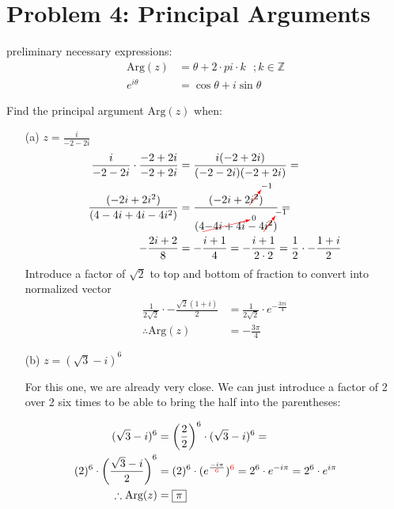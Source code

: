 \documentclass{article}
\newcommand{\canceling}[2]{\textcolor{red}{\cancelto{\textcolor{black}{#1}}{\textcolor{black}{#2}}}}
\begin{document}
\section*{Problem 4: Principal Arguments}
preliminary necessary expressions:
  \begin{align*}
    \text{Arg}(z) &= \theta + 2\cdot pi\cdot k\ \ \ ;k\in \mathbb{Z} \\
    e^{i\theta} &= \cos\theta + i\sin{\theta}
  \end{align*}

Find the principal argument $\text{Arg}(z)$ when:

\begin{enumerate}
    \item[(a)] $z = \frac{i}{-2-2i}$
      \begin{align*}
        \frac{i}{-2-2i}\cdot\frac{-2+2i}{-2+2i} &= \frac{i(-2+2i)}{(-2-2i)(-2+2i)} = \\ 
        \frac{(-2i+2i^2)}{(4-4i+4i-4i^2)} &= \frac{(-2i+2\canceling{-1}{i^2})}{(4\canceling{0}{-4i+4i}-4\canceling{-1}{i^2})} = \\
        -\frac{2i+2}{8} &= -\frac{i+1}{4} = -\frac{i+1}{2\cdot 2} = \frac{1}{2}\cdot -\frac{1+i}{2}
      \end{align*}
      Introduce  a factor of $\sqrt{2}$ to top and bottom of fraction to convert into normalized vector
      \begin{align*}
        \frac{1}{2\sqrt{2}}\cdot -\frac{\sqrt{2}(1+i)}{2} & = \frac{1}{2\sqrt{2}}\cdot e^{-\frac{3\pi i}{4}}\\
        \therefore \text{Arg}(z) &= \boxed{-\frac{3\pi}{4}} 
      \end{align*}
    \item[(b)] $z = (\sqrt{3}-i)^6$
      
      For this one, we are already very close. We can just introduce a factor of 2 over 2 six times to be able to bring the half into the parentheses:    
\end{enumerate}

      \begin{align*}
        (\sqrt{3}-i)^6 &= \left(\frac{2}{2}\right)^6\cdot (\sqrt{3}-i)^6 =\\
        (2)^6\cdot \left(\frac{\sqrt{3}-i}{2}\right)^6 &= (2)^6\cdot  (e^{\frac{-i\pi }{\textcolor{red}{6}}})^{\textcolor{red}{6}} = 2^6\cdot e^{-i\pi}= 2^6\cdot e^{i\pi}\\
        \therefore \text{Arg}(z) &= \boxed{\pi}
      \end{align*}
\newpage
\end{document}
